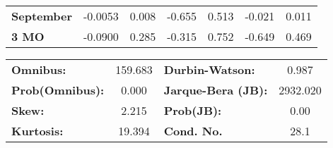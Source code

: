 \begin{center}
\begin{tabular}{lcccccc}
\textbf{September} &      -0.0053  &        0.008     &    -0.655  &         0.513        &       -0.021    &        0.011     \\
\textbf{3 MO}      &      -0.0900  &        0.285     &    -0.315  &         0.752        &       -0.649    &        0.469     \\
\bottomrule
\end{tabular}
\begin{tabular}{lclc}
\textbf{Omnibus:}       & 159.683 & \textbf{  Durbin-Watson:     } &    0.987  \\
\textbf{Prob(Omnibus):} &   0.000 & \textbf{  Jarque-Bera (JB):  } & 2932.020  \\
\textbf{Skew:}          &   2.215 & \textbf{  Prob(JB):          } &     0.00  \\
\textbf{Kurtosis:}      &  19.394 & \textbf{  Cond. No.          } &     28.1  \\
\bottomrule
\end{tabular}
\end{center}
